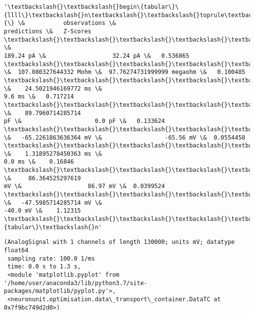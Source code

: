             \begin{tcolorbox}[breakable, size=fbox, boxrule=.5pt, pad at break*=1mm, opacityfill=0]
\begin{Verbatim}[commandchars=\\\{\}]
'\textbackslash{}\textbackslash{}begin\{tabular\}\{llll\}\textbackslash{}n\textbackslash{}\textbackslash{}toprule\textbackslash{}n\{\} \&           observations \&
predictions \&   Z-Scores \textbackslash{}\textbackslash{}\textbackslash{}\textbackslash{}\textbackslash{}n\textbackslash{}\textbackslash{}midrule\textbackslash{}nRheobaseTest                   \&
189.24 pA \&                   32.24 pA \&   0.536865 \textbackslash{}\textbackslash{}\textbackslash{}\textbackslash{}\textbackslash{}nInputResistanceTest
\&  107.080327644332 Mohm \&  97.76274731999999 megaohm \&   0.100485
\textbackslash{}\textbackslash{}\textbackslash{}\textbackslash{}\textbackslash{}nTimeConstantTest               \&    24.5021946169772 ms \&
9.6 ms \&   0.717214 \textbackslash{}\textbackslash{}\textbackslash{}\textbackslash{}\textbackslash{}nCapacitanceTest                \&    89.7960714285714
pF \&                     0.0 pF \&   0.133624 \textbackslash{}\textbackslash{}\textbackslash{}\textbackslash{}\textbackslash{}nRestingPotentialTest
\&   -65.2261863636364 mV \&                  -65.56 mV \&  0.0554458
\textbackslash{}\textbackslash{}\textbackslash{}\textbackslash{}\textbackslash{}nInjectedCurrentAPWidthTest     \&    1.31895278450363 ms \&
0.0 ms \&    0.16846 \textbackslash{}\textbackslash{}\textbackslash{}\textbackslash{}\textbackslash{}nInjectedCurrentAPAmplitudeTest \&     86.364525297619
mV \&                   86.97 mV \&  0.0399524
\textbackslash{}\textbackslash{}\textbackslash{}\textbackslash{}\textbackslash{}nInjectedCurrentAPThresholdTest \&   -47.5985714285714 mV \&
-40.0 mV \&    1.12315 \textbackslash{}\textbackslash{}\textbackslash{}\textbackslash{}\textbackslash{}n\textbackslash{}\textbackslash{}bottomrule\textbackslash{}n\textbackslash{}\textbackslash{}end\{tabular\}\textbackslash{}n'
\end{Verbatim}
\end{tcolorbox}
        
            \begin{tcolorbox}[breakable, size=fbox, boxrule=.5pt, pad at break*=1mm, opacityfill=0]
\begin{Verbatim}[commandchars=\\\{\}]
(AnalogSignal with 1 channels of length 130000; units mV; datatype float64
 sampling rate: 100.0 1/ms
 time: 0.0 s to 1.3 s,
 <module 'matplotlib.pyplot' from '/home/user/anaconda3/lib/python3.7/site-
packages/matplotlib/pyplot.py'>,
 <neuronunit.optimisation.data\_transport\_container.DataTC at 0x7f9bc749d2d0>)
\end{Verbatim}
\end{tcolorbox}
        

